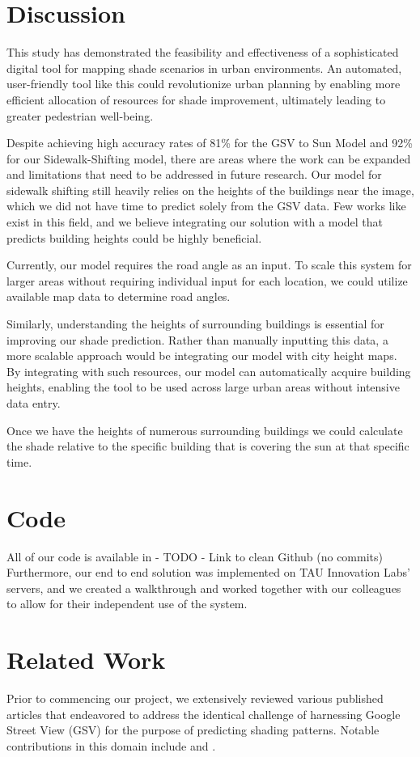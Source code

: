 \documentclass[nohyperref]{article}
\theoremstyle{plain}
\theoremstyle{definition}
\theoremstyle{remark}
\begin{document}
\section{Discussion}
\label{discussion}
This study has demonstrated the feasibility and effectiveness of a sophisticated digital tool for mapping shade scenarios in urban environments. An automated, user-friendly tool like this could revolutionize urban planning by enabling more efficient allocation of resources for shade improvement, ultimately leading to greater pedestrian well-being.

Despite achieving high accuracy rates of 81\% for the GSV to Sun Model and 92\% for our Sidewalk-Shifting model, there are areas where the work can be expanded and limitations that need to be addressed in future research. Our model for sidewalk shifting still heavily relies on the heights of the buildings near the image, which we did not have time to predict solely from the GSV data. Few works like \citet{YAN202283} exist in this field, and we believe integrating our solution with a model that predicts building heights could be highly beneficial.

Currently, our model requires the road angle as an input. To scale this system for larger areas without requiring individual input for each location, we could utilize available map data to determine road angles.

Similarly, understanding the heights of surrounding buildings is essential for improving our shade prediction. Rather than manually inputting this data, a more scalable approach would be integrating our model with city height maps. By integrating with such resources, our model can automatically acquire building heights, enabling the tool to be used across large urban areas without intensive data entry.

Once we have the heights of numerous surrounding buildings we could calculate the shade relative to the specific building that is covering the sun at that specific time.
\section{Code}
\label{code}
All of our code is available in - TODO - Link to clean Github (no commits)
Furthermore, our end to end solution was implemented on TAU Innovation Labs' servers, and we created a walkthrough and worked together with our colleagues to allow for their independent use of the system.

\section{Related Work}
\label{related-work}
Prior to commencing our project, we extensively reviewed various published articles that endeavored to address the identical challenge of harnessing Google Street View (GSV) for the purpose of predicting shading patterns. Notable contributions in this domain include \citet{DENG2021103289} and \citet{GONG2019547}.
\end{document}
